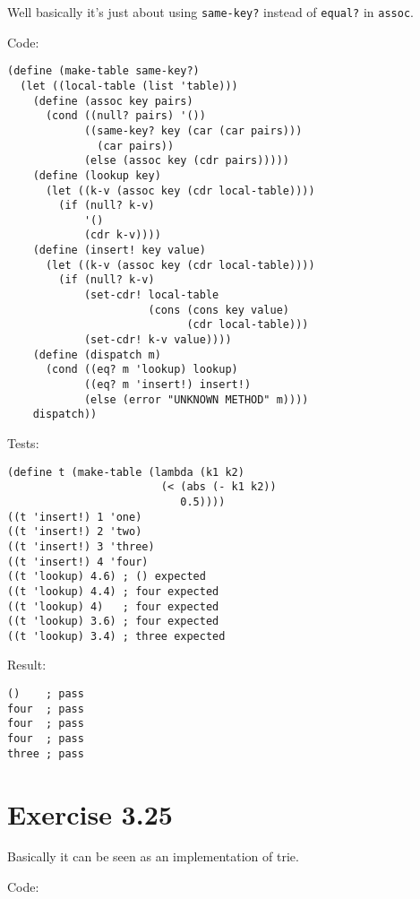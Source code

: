 \documentclass[../main.tex]{subfiles}
\begin{document}
Well basically it's just about using
 \lstinline{same-key?} instead of \lstinline{equal?}
 in \lstinline{assoc}.

Code:

\begin{lstlisting}
(define (make-table same-key?)
  (let ((local-table (list 'table)))
    (define (assoc key pairs)
      (cond ((null? pairs) '())
            ((same-key? key (car (car pairs)))
              (car pairs))
            (else (assoc key (cdr pairs)))))
    (define (lookup key)
      (let ((k-v (assoc key (cdr local-table))))
        (if (null? k-v)
            '()
            (cdr k-v))))
    (define (insert! key value)
      (let ((k-v (assoc key (cdr local-table))))
        (if (null? k-v)
            (set-cdr! local-table
                      (cons (cons key value)
                            (cdr local-table)))
            (set-cdr! k-v value))))
    (define (dispatch m)
      (cond ((eq? m 'lookup) lookup)
            ((eq? m 'insert!) insert!)
            (else (error "UNKNOWN METHOD" m))))
    dispatch))
\end{lstlisting}

Tests:

\begin{lstlisting}
(define t (make-table (lambda (k1 k2)
                        (< (abs (- k1 k2))
                           0.5))))
((t 'insert!) 1 'one)
((t 'insert!) 2 'two)
((t 'insert!) 3 'three)
((t 'insert!) 4 'four)
((t 'lookup) 4.6) ; () expected
((t 'lookup) 4.4) ; four expected
((t 'lookup) 4)   ; four expected
((t 'lookup) 3.6) ; four expected
((t 'lookup) 3.4) ; three expected
\end{lstlisting}

Result:

\begin{lstlisting}
()    ; pass
four  ; pass
four  ; pass
four  ; pass
three ; pass
\end{lstlisting}

\section{Exercise 3.25}

Basically it can be seen as an implementation
 of trie.

Code:
\end{document}
